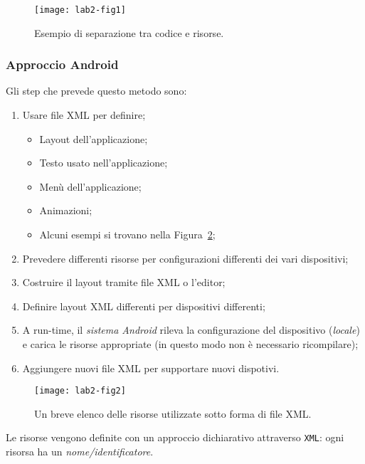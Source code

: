 \begin{figure}[htbp]
        \centering
        \texttt{[image: lab2-fig1]}
        \caption[Esempio di separazione tra codice e risorse]{Esempio di
separazione tra codice e risorse.}\label{img:lab2-fig1}
\end{figure}

\subsubsection{Approccio Android}

Gli step che prevede questo metodo sono:

\begin{enumerate}
\item Usare file XML per definire;
\begin{itemize}
\item Layout dell'applicazione;
\item Testo usato nell'applicazione;
\item Menù dell'applicazione;
\item Animazioni;
\item Alcuni esempi si trovano nella Figura~\ref{img:lab2-fig2};
\end{itemize}
\item Prevedere differenti risorse per configurazioni differenti dei vari
dispositivi;
\item Costruire il layout tramite file XML o l'editor;
\item Definire layout XML differenti per dispositivi differenti;
\item A run-time, il \textit{sistema Android} rileva la configurazione del
dispositivo (\textit{locale}) e carica le risorse appropriate (in questo modo
non è necessario ricompilare);
\item Aggiungere nuovi file XML per supportare nuovi dispotivi.
\end{enumerate}

\begin{figure}[htbp]
        \centering
        \texttt{[image: lab2-fig2]}
        \caption[Elenco risorse]{Un breve elenco delle risorse utilizzate sotto
forma di file XML.}\label{img:lab2-fig2}
\end{figure}

Le risorse vengono definite con un approccio dichiarativo attraverso
\texttt{XML}: ogni risorsa ha un \textit{nome/identificatore}.



